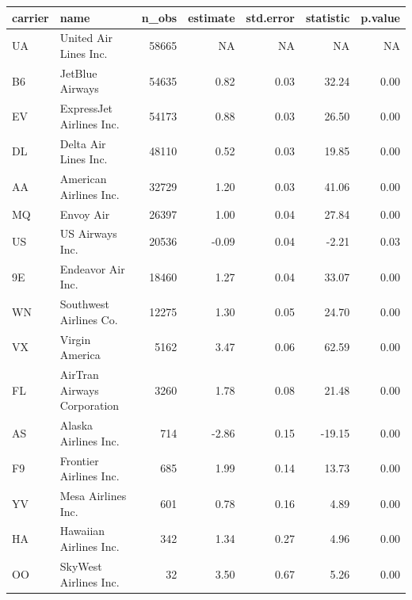 \documentclass[]{book}
\newenvironment{Shaded}{\begin{snugshade}}{\end{snugshade}}
\newcommand{\KeywordTok}[1]{\textcolor[rgb]{0.13,0.29,0.53}{\textbf{{#1}}}}
\newcommand{\DataTypeTok}[1]{\textcolor[rgb]{0.13,0.29,0.53}{{#1}}}
\newcommand{\DecValTok}[1]{\textcolor[rgb]{0.00,0.00,0.81}{{#1}}}
\newcommand{\StringTok}[1]{\textcolor[rgb]{0.31,0.60,0.02}{{#1}}}
\newcommand{\CommentTok}[1]{\textcolor[rgb]{0.56,0.35,0.01}{\textit{{#1}}}}
\newcommand{\OtherTok}[1]{\textcolor[rgb]{0.56,0.35,0.01}{{#1}}}
\newcommand{\NormalTok}[1]{{#1}}
\theoremstyle{definition}
\theoremstyle{definition}
\theoremstyle{remark}
\begin{document}
\begin{Shaded}
\end{Shaded}

\begin{tabular}{l|l|r|r|r|r|r}
\hline
carrier & name & n\_obs & estimate & std.error & statistic & p.value\\
\hline
UA & United Air Lines Inc. & 58665 & NA & NA & NA & NA\\
\hline
B6 & JetBlue Airways & 54635 & 0.82 & 0.03 & 32.24 & 0.00\\
\hline
EV & ExpressJet Airlines Inc. & 54173 & 0.88 & 0.03 & 26.50 & 0.00\\
\hline
DL & Delta Air Lines Inc. & 48110 & 0.52 & 0.03 & 19.85 & 0.00\\
\hline
AA & American Airlines Inc. & 32729 & 1.20 & 0.03 & 41.06 & 0.00\\
\hline
MQ & Envoy Air & 26397 & 1.00 & 0.04 & 27.84 & 0.00\\
\hline
US & US Airways Inc. & 20536 & -0.09 & 0.04 & -2.21 & 0.03\\
\hline
9E & Endeavor Air Inc. & 18460 & 1.27 & 0.04 & 33.07 & 0.00\\
\hline
WN & Southwest Airlines Co. & 12275 & 1.30 & 0.05 & 24.70 & 0.00\\
\hline
VX & Virgin America & 5162 & 3.47 & 0.06 & 62.59 & 0.00\\
\hline
FL & AirTran Airways Corporation & 3260 & 1.78 & 0.08 & 21.48 & 0.00\\
\hline
AS & Alaska Airlines Inc. & 714 & -2.86 & 0.15 & -19.15 & 0.00\\
\hline
F9 & Frontier Airlines Inc. & 685 & 1.99 & 0.14 & 13.73 & 0.00\\
\hline
YV & Mesa Airlines Inc. & 601 & 0.78 & 0.16 & 4.89 & 0.00\\
\hline
HA & Hawaiian Airlines Inc. & 342 & 1.34 & 0.27 & 4.96 & 0.00\\
\hline
OO & SkyWest Airlines Inc. & 32 & 3.50 & 0.67 & 5.26 & 0.00\\
\hline
\end{tabular}
\end{document}
